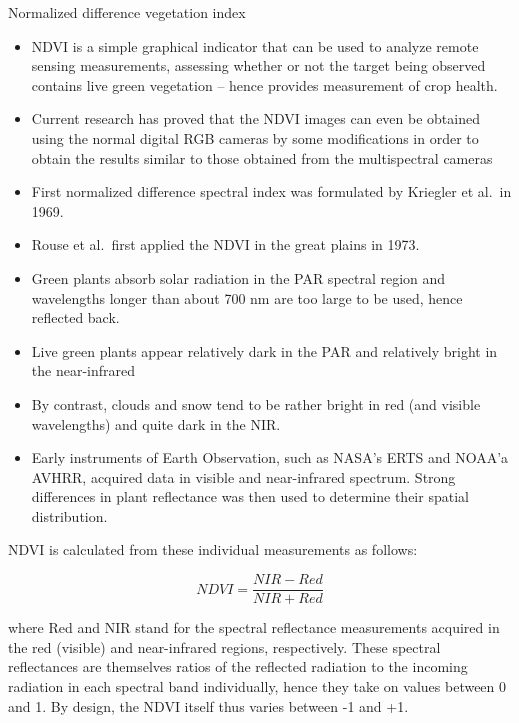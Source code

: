 \documentclass[11pt,dvipsnames,ignorenonframetext,aspectratio=169]{beamer}
\providecommand{\tightlist}{%
  \setlength{\itemsep}{0pt}\setlength{\parskip}{0pt}}
\begin{document}
\begin{frame}{Normalized difference vegetation index}
\protect\hypertarget{normalized-difference-vegetation-index}{}
\begin{itemize}
\tightlist
\item
  NDVI is a simple graphical indicator that can be used to analyze
  remote sensing measurements, assessing whether or not the target being
  observed contains live green vegetation -- hence provides measurement
  of crop health.
\item
  Current research has proved that the NDVI images can even be obtained
  using the normal digital RGB cameras by some modifications in order to
  obtain the results similar to those obtained from the multispectral
  cameras
\item
  First normalized difference spectral index was formulated by Kriegler
  et al.~in 1969.
\item
  Rouse et al.~first applied the NDVI in the great plains in 1973.
\end{itemize}
\end{frame}

\begin{frame}{}
\protect\hypertarget{section-7}{}
\begin{itemize}
\tightlist
\item
  Green plants absorb solar radiation in the PAR spectral region and
  wavelengths longer than about 700 nm are too large to be used, hence
  reflected back.
\item
  Live green plants appear relatively dark in the PAR and relatively
  bright in the near-infrared
\item
  By contrast, clouds and snow tend to be rather bright in red (and
  visible wavelengths) and quite dark in the NIR.
\item
  Early instruments of Earth Observation, such as NASA's ERTS and NOAA'a
  AVHRR, acquired data in visible and near-infrared spectrum. Strong
  differences in plant reflectance was then used to determine their
  spatial distribution.
\end{itemize}
\end{frame}

\begin{frame}{}
\protect\hypertarget{section-8}{}
NDVI is calculated from these individual measurements as follows:

\[
NDVI = \frac{NIR - Red}{NIR + Red}
\]

where Red and NIR stand for the spectral reflectance measurements
acquired in the red (visible) and near-infrared regions, respectively.
These spectral reflectances are themselves ratios of the reflected
radiation to the incoming radiation in each spectral band individually,
hence they take on values between 0 and 1. By design, the NDVI itself
thus varies between -1 and +1.
\end{frame}
\end{document}
